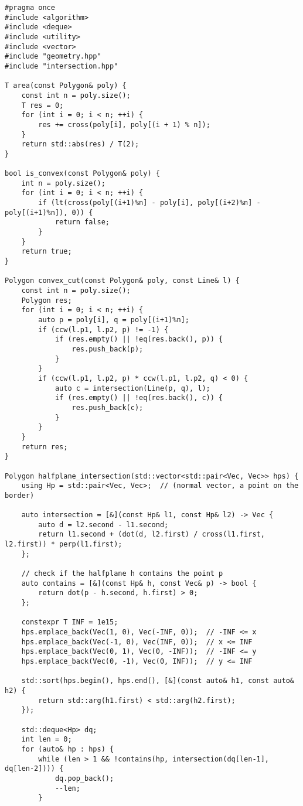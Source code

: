 \begin{lstlisting}
#pragma once
#include <algorithm>
#include <deque>
#include <utility>
#include <vector>
#include "geometry.hpp"
#include "intersection.hpp"

T area(const Polygon& poly) {
    const int n = poly.size();
    T res = 0;
    for (int i = 0; i < n; ++i) {
        res += cross(poly[i], poly[(i + 1) % n]);
    }
    return std::abs(res) / T(2);
}

bool is_convex(const Polygon& poly) {
    int n = poly.size();
    for (int i = 0; i < n; ++i) {
        if (lt(cross(poly[(i+1)%n] - poly[i], poly[(i+2)%n] - poly[(i+1)%n]), 0)) {
            return false;
        }
    }
    return true;
}

Polygon convex_cut(const Polygon& poly, const Line& l) {
    const int n = poly.size();
    Polygon res;
    for (int i = 0; i < n; ++i) {
        auto p = poly[i], q = poly[(i+1)%n];
        if (ccw(l.p1, l.p2, p) != -1) {
            if (res.empty() || !eq(res.back(), p)) {
                res.push_back(p);
            }
        }
        if (ccw(l.p1, l.p2, p) * ccw(l.p1, l.p2, q) < 0) {
            auto c = intersection(Line(p, q), l);
            if (res.empty() || !eq(res.back(), c)) {
                res.push_back(c);
            }
        }
    }
    return res;
}

Polygon halfplane_intersection(std::vector<std::pair<Vec, Vec>> hps) {
    using Hp = std::pair<Vec, Vec>;  // (normal vector, a point on the border)

    auto intersection = [&](const Hp& l1, const Hp& l2) -> Vec {
        auto d = l2.second - l1.second;
        return l1.second + (dot(d, l2.first) / cross(l1.first, l2.first)) * perp(l1.first);
    };

    // check if the halfplane h contains the point p
    auto contains = [&](const Hp& h, const Vec& p) -> bool {
        return dot(p - h.second, h.first) > 0;
    };

    constexpr T INF = 1e15;
    hps.emplace_back(Vec(1, 0), Vec(-INF, 0));  // -INF <= x
    hps.emplace_back(Vec(-1, 0), Vec(INF, 0));  // x <= INF
    hps.emplace_back(Vec(0, 1), Vec(0, -INF));  // -INF <= y
    hps.emplace_back(Vec(0, -1), Vec(0, INF));  // y <= INF

    std::sort(hps.begin(), hps.end(), [&](const auto& h1, const auto& h2) {
        return std::arg(h1.first) < std::arg(h2.first);
    });

    std::deque<Hp> dq;
    int len = 0;
    for (auto& hp : hps) {
        while (len > 1 && !contains(hp, intersection(dq[len-1], dq[len-2]))) {
            dq.pop_back();
            --len;
        }


\end{lstlisting}
